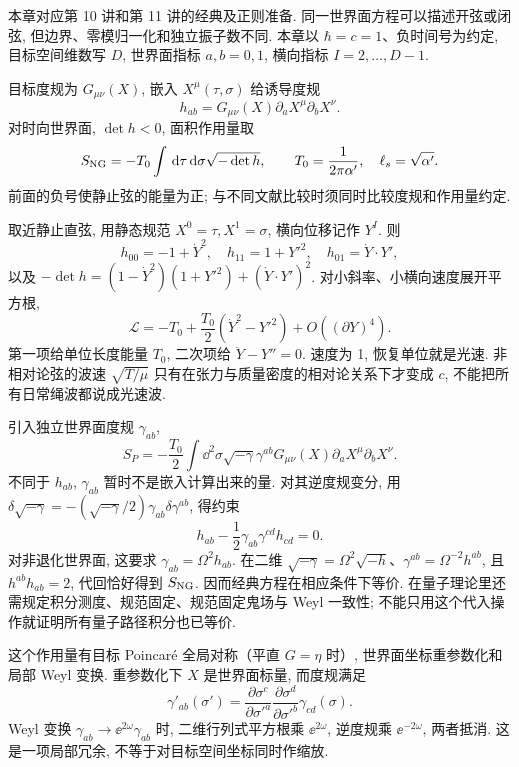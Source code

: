本章对应第 10 讲和第 11 讲的经典及正则准备. 同一世界面方程可以描述开弦或闭弦, 但边界、零模归一化和独立振子数不同. 本章以 $\hbar=c=1$、负时间号为约定, 目标空间维数写 $D$, 世界面指标 $a,b=0,1$, 横向指标 $I=2,\ldots,D-1$.

目标度规为 $G_{\mu\nu}(X)$, 嵌入 $X^\mu(\tau,\sigma)$ 给诱导度规
\[
h_{ab}=G_{\mu\nu}(X)\partial_aX^\mu\partial_bX^\nu.
\]
对时向世界面, $\det h<0$, 面积作用量取
\[
S_{\rm NG}=-T_0\int\,\mathrm d\tau\,\mathrm d\sigma\sqrt{-\det h},
\qquad T_0=\frac1{2\pi\alpha'},\quad \ell_s=\sqrt{\alpha'}.
\]
前面的负号使静止弦的能量为正; 与不同文献比较时须同时比较度规和作用量约定.

取近静止直弦, 用静态规范 $X^0=\tau,X^1=\sigma$, 横向位移记作 $Y^I$. 则
\[
h_{00}=-1+\dot Y^2,\quad h_{11}=1+Y'^2,
\quad h_{01}=\dot Y\cdot Y',
\]
以及 $-\det h=(1-\dot Y^2)(1+Y'^2)+(\dot Y\cdot Y')^2$. 对小斜率、小横向速度展开平方根,
\[
\mathcal L=-T_0+\frac{T_0}2(\dot Y^2-Y'^2)+O((\partial Y)^4).
\]
第一项给单位长度能量 $T_0$, 二次项给 $\ddot Y-Y''=0$. 速度为 1, 恢复单位就是光速. 非相对论弦的波速 $\sqrt{T/\mu}$ 只有在张力与质量密度的相对论关系下才变成 $c$, 不能把所有日常绳波都说成光速波.

引入独立世界面度规 $\gamma_{ab}$,
\begin{equation}\label{eq:Polyakov}
S_P=-\frac{T_0}2\int\dd^2\sigma\sqrt{-\gamma}
\gamma^{ab}G_{\mu\nu}(X)\partial_aX^\mu\partial_bX^\nu.
\end{equation}
不同于 $h_{ab}$, $\gamma_{ab}$ 暂时不是嵌入计算出来的量. 对其逆度规变分, 用 $\delta\sqrt{-\gamma}=-(\sqrt{-\gamma}/2)\gamma_{ab}\delta\gamma^{ab}$, 得约束
\[
h_{ab}-\frac12\gamma_{ab}\gamma^{cd}h_{cd}=0.
\]
对非退化世界面, 这要求 $\gamma_{ab}=\Omega^2h_{ab}$. 在二维 $\sqrt{-\gamma}=\Omega^2\sqrt{-h}$、$\gamma^{ab}=\Omega^{-2}h^{ab}$, 且 $h^{ab}h_{ab}=2$, 代回恰好得到 $S_{\rm NG}$. 因而经典方程在相应条件下等价. 在量子理论里还需规定积分测度、规范固定、规范固定鬼场与 Weyl 一致性; 不能只用这个代入操作就证明所有量子路径积分也已等价.

这个作用量有目标 Poincaré 全局对称（平直 $G=\eta$ 时）, 世界面坐标重参数化和局部 Weyl 变换. 重参数化下 $X$ 是世界面标量, 而度规满足
\[
\gamma'_{ab}(\sigma')=
\frac{\partial\sigma^c}{\partial\sigma'^a}
\frac{\partial\sigma^d}{\partial\sigma'^b}\gamma_{cd}(\sigma).
\]
Weyl 变换 $\gamma_{ab}\to\ee^{2\omega}\gamma_{ab}$ 时, 二维行列式平方根乘 $\ee^{2\omega}$, 逆度规乘 $\ee^{-2\omega}$, 两者抵消. 这是一项局部冗余, 不等于对目标空间坐标同时作缩放.

